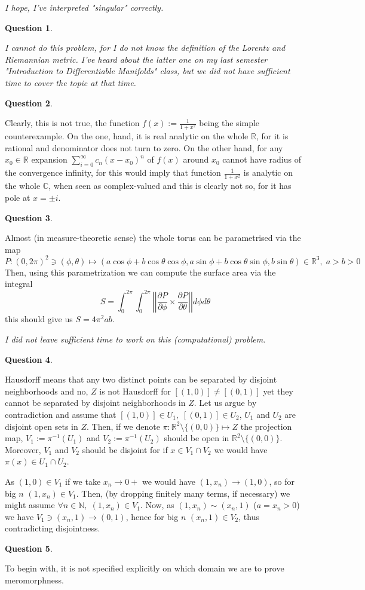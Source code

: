 \documentclass[8pt]{article} %
\newcommand{\mynorm}[1]{\left|\left|#1\right|\right|}
\newtheorem*{prob}{Question}
\begin{document}
	\textit{I hope, I've interpreted "singular" correctly.
	}
\begin{prob}\end{prob}%
	\textit{I cannot do this problem, for I do not know the definition of the Lorentz and Riemannian metric. I've heard about the latter
	one on my last semester "Introduction to Differentiable Manifolds" class, but we did not have sufficient time to cover the topic at that
	time.}
\begin{prob}\end{prob}
	Clearly, this is not true, the function $f(x):=\frac{1}{1+x^2}$ being the simple counterexample. On the one, hand, it is real analytic
	on the whole $\mathbb{R}$, for it is rational and denominator does not turn to zero. On the other hand, for any $x_0\in\mathbb{R}$ expansion
	$\sum_{i=0}^{\infty}c_n(x-x_0)^n$ of $f(x)$ around $x_0$ cannot have radius of the convergence infinity, for this would imply that
	function $\frac{1}{1+x^2}$ is analytic on the whole $\mathbb{C}$, when seen as complex-valued and this is clearly not so, for it
	has pole at $x=\pm i$.
\begin{prob}\end{prob}
	Almost (in measure-theoretic sense) the whole torus can be parametrised via the map
	\[P:(0,2\pi)^2\ni(\phi,\theta)\mapsto (a\cos\phi+b\cos\theta\cos\phi
	,a\sin\phi+{b}\cos\theta\sin\phi,b\sin\theta)\in\mathbb{R}^3,\;a>b>0\]
	Then, using this parametrization we can compute the surface area via the integral
	\[S=\int_0^{2\pi}\int_0^{2\pi}\mynorm{\frac{\partial P}{\partial \phi}\times\frac{\partial P}{\partial \theta}}d\phi d\theta\]
	this should give us $S=4\pi^2ab$.

	\textit{I did not leave sufficient time to work on this (computational) problem.}
\begin{prob}\end{prob}
	Hausdorff means that any two distinct points can be separated by disjoint neighborhoods and no, $Z$ is not Hausdorff for $[(1,0)]\neq
	[(0,1)]$ yet they cannot be separated by disjoint neighborhoods in $Z$. Let us argue by contradiction and assume that $[(1,0)]\in U_1,\;
	[(0,1)]\in U_2$, $U_1$ and $U_2$ are disjoint open sets in $Z$. Then, if we denote $\pi:\mathbb{R}^2\setminus\{(0,0)\}\mapsto Z$
	the projection map, $V_1:=\pi^{-1}(U_1)$ and $V_2:=\pi^{-1}(U_2)$
	should be open in $\mathbb{R}^2\setminus\{(0,0)\}$. Moreover, $V_1$ and $V_2$ should be disjoint for if $x\in V_1\cap V_2$ we would
	have $\pi(x)\in U_1\cap U_2$.

	As $(1,0)\in V_1$ if we take $x_n\to 0+$ we would have $(1,x_n)\to (1,0)$, so for big $n$ $(1,x_n)\in V_1$. Then, (by dropping
	finitely many terms, if necessary) we might assume $\forall n\in\mathbb{N},\;(1,x_n)\in V_1$. Now, as $(1,x_n)\sim (x_n,1)$ ($a=x_n>0$)
	we have $V_1\ni (x_n,1)\to(0,1)$, hence for big $n$ $(x_n,1)\in V_2$, thus contradicting disjointness.
\begin{prob}\end{prob}
To begin with, it is not specified explicitly on which domain we are to prove meromorphness.
\end{document}
